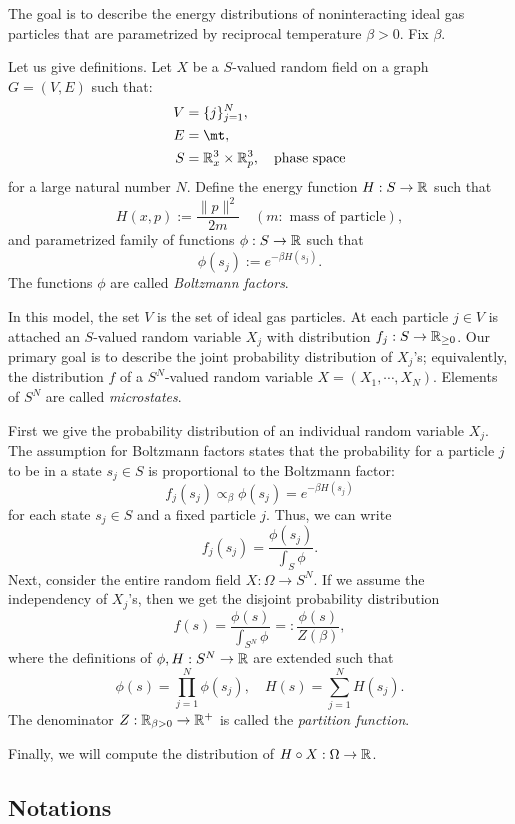 \documentclass{../exp}
\begin{document}
\begin{ex}
The goal is to describe the energy distributions of noninteracting ideal gas particles that are parametrized by reciprocal temperature $\beta>0$.
Fix $\beta$.

Let us give definitions.
Let $X$ be a $S$-valued random field on a graph $G=(V,E)$ such that:
\begin{align*}
V&=\{j\}_{j=1}^N,\\
E&=\mt,\\
S&=\R_x^3\times\R_p^3,\quad\text{phase space}
\end{align*}
for a large natural number $N$.
Define the energy function $H:S\to\mathbb{R}$ such that
\[H(x,p):=\frac{\|p\|^2}{2m}\quad(m:\text{ mass of particle}),\]
and parametrized family of functions $\phi:S\to\mathbb{R}$ such that
\[\phi(s_j):=e^{-\beta H(s_j)}.\]
The functions $\phi$ are called \emph{Boltzmann factors}.

In this model, the set $V$ is the set of ideal gas particles.
At each particle $j\in V$ is attached an $S$-valued random variable $X_j$ with distribution $f_j:S\to\mathbb{R}_{\ge0}$.
Our primary goal is to describe the joint probability distribution of $X_j$'s; equivalently, the distribution $f$ of a $S^N$-valued random variable $X=(X_1,\cdots,X_N)$.
Elements of $S^N$ are called \emph{microstates}.

First we give the probability distribution of an individual random variable $X_j$.
The assumption for Boltzmann factors states that the probability for a particle $j$ to be in a state $s_j\in S$ is proportional to the Boltzmann factor:
\[f_j(s_j)\propto_\beta\phi(s_j)=e^{-\beta H(s_j)}\]
for each state $s_j\in S$ and a fixed particle $j$.
Thus, we can write
\[f_j(s_j)=\frac{\phi(s_j)}{\int_S\phi}.\]
Next, consider the entire random field $X:\Omega\to S^N$.
If we assume the independency of $X_j$'s, then we get the disjoint probability distribution
\[f(s)=\frac{\phi(s)}{\int_{S^N}\phi}=:\frac{\phi(s)}{Z(\beta)},\]
where the definitions of $\phi,H:S^N\to\mathbb{R}$ are extended such that
\[\phi(s)=\prod_{j=1}^N\phi(s_j),\quad H(s)=\sum_{j=1}^NH(s_j).\]
The denominator $Z:\mathbb{R}_{\beta>0}\to\mathbb{R}^+$ is called the \emph{partition function}.

Finally, we will compute the distribution of $H\circ X:\Omega\to\mathbb{R}$.
\end{ex}


\subsection{Notations}
\end{document}
